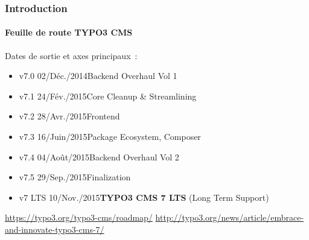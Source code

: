\begin{frame}[fragile]
	\frametitle{Introduction}
	\framesubtitle{Feuille de route TYPO3 CMS}

	Dates de sortie et axes principaux~:

	\begin{itemize}
		\item v7.0 \tabto{1.1cm}02/Déc./2014\tabto{3.4cm}Backend Overhaul Vol 1
		\item v7.1 \tabto{1.1cm}24/Fév./2015\tabto{3.4cm}Core Cleanup \& Streamlining
		\item v7.2 \tabto{1.1cm}28/Avr./2015\tabto{3.4cm}Frontend
		\item v7.3 \tabto{1.1cm}16/Juin/2015\tabto{3.4cm}Package Ecosystem, Composer
		\item v7.4 \tabto{1.1cm}04/Août/2015\tabto{3.4cm}Backend Overhaul Vol 2
		\item v7.5 \tabto{1.1cm}29/Sep./2015\tabto{3.4cm}Finalization

		\item
			\begingroup
				\color{typo3orange}
					v7 LTS \tabto{1.1cm}10/Nov./2015\tabto{3.4cm}\textbf{TYPO3 CMS 7 LTS} (Long Term Support)
			\endgroup

	\end{itemize}

	\smaller
		\url{https://typo3.org/typo3-cms/roadmap/}\newline
		\url{http://typo3.org/news/article/embrace-and-innovate-typo3-cms-7/}
	\normalsize

\end{frame}

